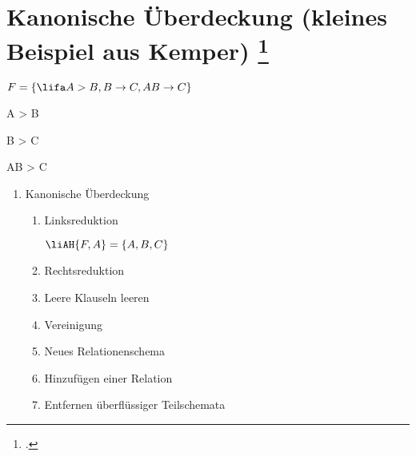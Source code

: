 \documentclass{lehramt-informatik-aufgabe}
\begin{document}

\section{Kanonische Überdeckung (kleines Beispiel aus Kemper)
\footcite[Seite 186]{kemper}
}

$F = \{\lifa A > B, B \rightarrow C, AB \rightarrow C\}$

\begin{compactitem}
\item \lifa A > B
\item \lifa B > C
\item \lifa  AB > C
\end{compactitem}

\begin{enumerate}
\item Kanonische Überdeckung

\begin{enumerate}
\item Linksreduktion

$\liAH{F, A} = \{A, B, C\}$


\item Rechtsreduktion


\item Leere Klauseln leeren


\item Vereinigung

\item Neues Relationenschema


\item Hinzufügen einer Relation
\item Entfernen überflüssiger Teilschemata

\end{enumerate}
\end{enumerate}
\end{document}
